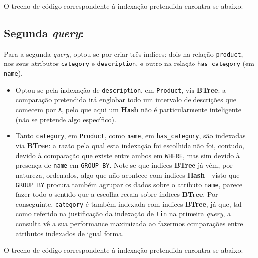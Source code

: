 \documentclass[12pt,a4paper]{article}
\begin{document}
O trecho de código correspondente à indexação pretendida encontra-se abaixo:



\subsection*{Segunda \textit{query}:}



Para a segunda \textit{query}, optou-se por criar três índices: dois na relação
\texttt{product}, nos seus atributos \texttt{category} e \texttt{description},
e outro na relação \texttt{has\_category} (em \texttt{name}).

\vspace*{0.25cm}

\begin{itemize}
  \item Optou-se pela indexação de \texttt{description}, em \texttt{Product},
        via \textbf{BTree}: a comparação pretendida irá englobar todo um intervalo
        de descrições que comecem por \texttt{A}, pelo que aqui um \textbf{Hash}
        não é particularmente inteligente (não se pretende algo específico).
  \item Tanto \texttt{category}, em \texttt{Product}, como \texttt{name}, em \texttt{has\_category},
        são indexadas via \textbf{BTree}: a razão pela qual esta indexação foi escolhida
        não foi, contudo, devido à comparação que existe entre ambos em \texttt{WHERE},
        mas sim devido à presença de \texttt{name} em \texttt{GROUP BY}. Note-se que
        índices \textbf{BTree} já vêm, por natureza, ordenados, algo que não
        acontece com índices \textbf{Hash} - visto que \texttt{GROUP BY} procura
        também agrupar os dados sobre o atributo \texttt{name}, parece fazer todo
        o sentido que a escolha recaia sobre índices \textbf{BTree}. Por conseguinte,
        \texttt{category} é também indexada com índices \textbf{BTree}, já que, tal como referido na justificação
        da indexação de \texttt{tin} na primeira \textit{query}, a consulta
        vê a sua performance maximizada ao fazermos comparações entre atributos
        indexados de igual forma.
\end{itemize}

O trecho de código correspondente à indexação pretendida encontra-se abaixo:


\end{document}
